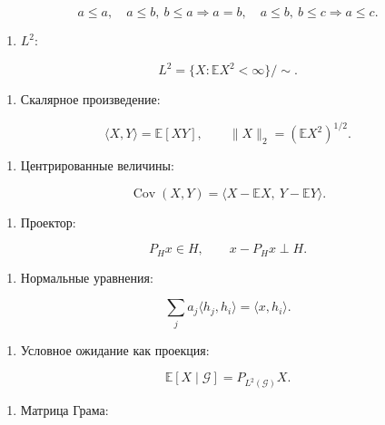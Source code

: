 \documentclass[
  11pt,
  a4paper,
]{article}
\providecommand{\tightlist}{%
  \setlength{\itemsep}{0pt}\setlength{\parskip}{0pt}}
\begin{document}
\[
a\le a,\quad
a\le b,\ b\le a\Rightarrow a=b,\quad
a\le b,\ b\le c\Rightarrow a\le c.
\]

\begin{enumerate}
\def\labelenumi{\arabic{enumi}.}
\setcounter{enumi}{1}
\tightlist
\item
  \(L^2\):
\end{enumerate}

\[
L^2=\{X:\mathbb EX^2<\infty\}/\sim.
\]

\begin{enumerate}
\def\labelenumi{\arabic{enumi}.}
\setcounter{enumi}{2}
\tightlist
\item
  Скалярное произведение:
\end{enumerate}

\[
\langle X,Y\rangle=\mathbb E[XY],
\qquad
\|X\|_2=(\mathbb EX^2)^{1/2}.
\]

\begin{enumerate}
\def\labelenumi{\arabic{enumi}.}
\setcounter{enumi}{3}
\tightlist
\item
  Центрированные величины:
\end{enumerate}

\[
\operatorname{Cov}(X,Y)
=
\langle X-\mathbb EX,\ Y-\mathbb EY\rangle.
\]

\begin{enumerate}
\def\labelenumi{\arabic{enumi}.}
\setcounter{enumi}{4}
\tightlist
\item
  Проектор:
\end{enumerate}

\[
P_Hx\in H,
\qquad
x-P_Hx\perp H.
\]

\begin{enumerate}
\def\labelenumi{\arabic{enumi}.}
\setcounter{enumi}{5}
\tightlist
\item
  Нормальные уравнения:
\end{enumerate}

\[
\sum_j a_j\langle h_j,h_i\rangle=\langle x,h_i\rangle.
\]

\begin{enumerate}
\def\labelenumi{\arabic{enumi}.}
\setcounter{enumi}{6}
\tightlist
\item
  Условное ожидание как проекция:
\end{enumerate}

\[
\mathbb E[X\mid\mathcal G]
=
P_{L^2(\mathcal G)}X.
\]

\begin{enumerate}
\def\labelenumi{\arabic{enumi}.}
\setcounter{enumi}{7}
\tightlist
\item
  Матрица Грама:
\end{enumerate}
\end{document}
